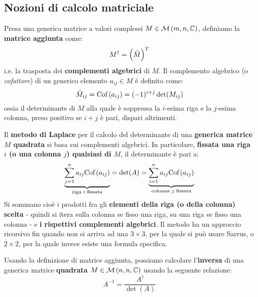 \subsection{Nozioni di calcolo matriciale}
\begin{prop}
Presa una generica matrice a valori complessi $M \in \mathcal{M}\left( m,n,\mathbb{C} \right)$, definiamo la \textbf{matrice aggiunta} come:
\begin{equation}
M^\dag = \left( \hat M \right)^T\end{equation}
i.e. la trasposta dei \textbf{complementi algebrici} di $M$. Il complemento algebrico (o \textit{cofattore}) di un generico elemento $a_{ij} \in M$ è definito come:
\begin{equation}
\hat{M}_{ij} = \textrm{Cof}\left( a_{ij} \right) = (-1)^{i+j} \det(M_{ij})
\end{equation}
ossia il determinante di $M$ alla quale è soppressa la $i$-esima riga e la $j$-esima colonna, preso positivo se $i+j$ è pari, dispari altrimenti. 

\end{prop}
\begin{prop}
Il \textbf{metodo di Laplace} per il calcolo del determinante di una \textbf{generica matrice $M$ quadrata} si basa sui complementi algebrici. In particolare, \textbf{fissata una riga $i$ (o una colonna $j$) qualsiasi di $M$}, il determinante è pari a:
\begin{equation} \underbrace{\sum_{j=1}^n a_{ij} \textrm{Cof}\left( a_{ij} \right)}_{\textrm{riga $i$ fissata}} = \det(A) = \underbrace{\sum_{i=1}^n a_{ij} \textrm{Cof}\left( a_{ij} \right)}_{\textrm{colonna $j$ fissata}}
\end{equation}
Si sommano cioè i prodotti fra gli \textbf{elementi della riga (o della colonna) scelta} - quindi si itera sulla colonna se fisso una riga, su una riga se fisso una colonna - e \textbf{i rispettivi complementi algebrici}. Il metodo ha un approccio ricorsivo fin quando non si arriva ad una $3\times 3$, per la quale si può usare Sarrus, o $2\times 2$, per la quale invece esiste una formula specifica.
\end{prop}
\begin{prop}
Usando la definizione di matrice aggiunta, possiamo calcolare l'\textbf{inversa} di una generica matrice \textbf{quadrata} $M \in \mathcal{M}\left( n,n,\mathbb{C} \right)$ usando la seguente relazione:
\begin{equation}
A^{-1} = \frac{A^\dag}{\det(A)}
\end{equation}
\end{prop}

